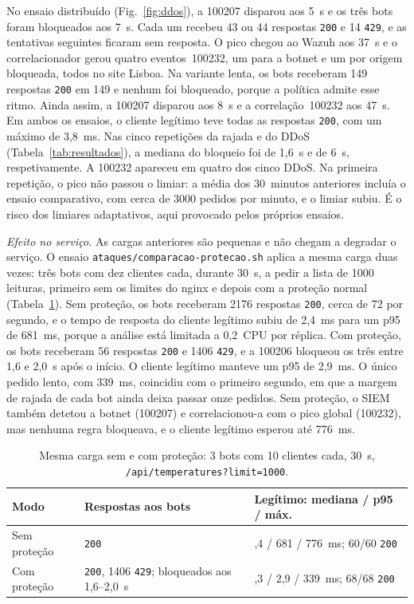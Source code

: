 \documentclass[conference,a4paper]{IEEEtran}
\newcommand{\code}[1]{\texttt{\small #1}}
\begin{document}
No ensaio distribuído (Fig.~\ref{fig:ddos}), a 100207 disparou aos 5~s e os três bots foram bloqueados aos 7~s. Cada um recebeu 43 ou 44 respostas \code{200} e 14 \code{429}, e as tentativas seguintes ficaram sem resposta. O pico chegou ao Wazuh aos 37~s e o correlacionador gerou quatro eventos~100232, um para a botnet e um por origem bloqueada, todos no site Lisboa. Na variante lenta, os bots receberam 149 respostas \code{200} em 149 e nenhum foi bloqueado, porque a política admite esse ritmo. Ainda assim, a 100207 disparou aos 8~s e a correlação~100232 aos 47~s. Em ambos os ensaios, o cliente legítimo teve todas as respostas \code{200}, com um máximo de 3,8~ms. Nas cinco repetições da rajada e do DDoS (Tabela~\ref{tab:resultados}), a mediana do bloqueio foi de 1,6~s e de 6~s, respetivamente. A 100232 apareceu em quatro dos cinco DDoS. Na primeira repetição, o pico não passou o limiar: a média dos 30~minutos anteriores incluía o ensaio comparativo, com cerca de 3000 pedidos por minuto, e o limiar subiu. É o risco dos limiares adaptativos, aqui provocado pelos próprios ensaios.

\emph{Efeito no serviço.} As cargas anteriores são pequenas e não chegam a degradar o serviço. O ensaio \code{ataques/comparacao-protecao.sh} aplica a mesma carga duas vezes: três bots com dez clientes cada, durante 30~s, a pedir a lista de 1000 leituras, primeiro sem os limites do nginx e depois com a proteção normal (Tabela~\ref{tab:protecao}). Sem proteção, os bots receberam 2176 respostas \code{200}, cerca de 72 por segundo, e o tempo de resposta do cliente legítimo subiu de 2,4~ms para um p95 de 681~ms, porque a análise está limitada a 0,2~CPU por réplica. Com proteção, os bots receberam 56 respostas \code{200} e 1406 \code{429}, e a 100206 bloqueou os três entre 1,6 e 2,0~s após o início. O cliente legítimo manteve um p95 de 2,9~ms. O único pedido lento, com 339~ms, coincidiu com o primeiro segundo, em que a margem de rajada de cada bot ainda deixa passar onze pedidos. Sem proteção, o SIEM também detetou a botnet (100207) e correlacionou-a com o pico global (100232), mas nenhuma regra bloqueava, e o cliente legítimo esperou até 776~ms.

\begin{table}[!t]
\centering
\caption{Mesma carga sem e com proteção: 3 bots com 10 clientes cada, 30~s, \code{/api/temperatures?limit=1000}.}
\label{tab:protecao}
\setlength{\tabcolsep}{3pt}
\begin{tabular}{@{}>{\raggedright\arraybackslash}p{}>{\raggedright\arraybackslash}p{}>{\raggedright\arraybackslash}p{}@{}}
\toprule
Modo & Respostas aos bots & Legítimo: mediana / p95 / máx. \\
\midrule
Sem proteção & 2176 \code{200} & 2,4 / 681 / 776~ms; 60/60 \code{200} \\
Com proteção & 56 \code{200}, 1406 \code{429}; bloqueados aos 1,6--2,0~s & 2,3 / 2,9 / 339~ms; 68/68 \code{200} \\
\bottomrule
\end{tabular}
\end{table}
\end{document}
